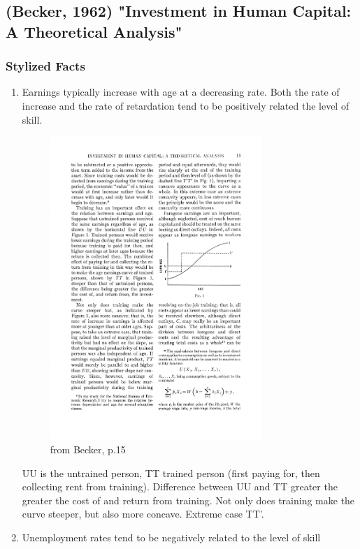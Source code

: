 \documentclass[12pt,a4paper]{article}
\begin{document}
  \subsection{(Becker, 1962) "Investment in Human Capital: A Theoretical Analysis"} %
  \label{prt:Becker}

  \subsubsection{Stylized Facts} %
  \begin{enumerate}
    \item Earnings typically increase with age at a decreasing rate. Both the rate of increase and the rate of retardation tend to be positively related the level of skill.\\
      \begin{figure}[ht]
        \centering
        \includegraphics[width=8cm]{fig1.pdf}
        \caption{from Becker, p.15}
        \label{fig1}
      \end{figure}
      UU is the untrained person, TT trained person (first paying for, then collecting rent from training). Difference between UU and TT greater the greater the cost of and return from training. Not only does training make the curve steeper, but also more concave. Extreme case TT'.
    \item Unemployment rates tend to be negatively related to the level of skill
      \begin{itemize}

\end{itemize}
\end{enumerate}
\end{document}
